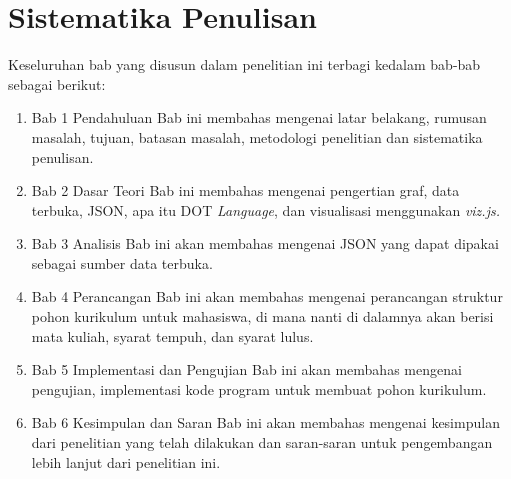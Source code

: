 \section{Sistematika Penulisan}
\label{sec:Sistematika Penulisan}
Keseluruhan bab yang disusun dalam penelitian ini terbagi kedalam bab-bab sebagai berikut:
\begin{enumerate}
\item Bab 1 Pendahuluan
Bab ini membahas mengenai latar belakang, rumusan masalah, tujuan, batasan masalah,
metodologi penelitian dan sistematika penulisan.
\item Bab 2 Dasar Teori
Bab ini membahas mengenai pengertian graf, data terbuka, JSON, apa itu DOT \textit{Language}, dan visualisasi menggunakan \textit{viz.js.}
\item Bab 3 Analisis 
Bab ini akan membahas mengenai JSON yang dapat dipakai sebagai sumber data terbuka.
\item Bab 4 Perancangan 
Bab ini akan membahas mengenai perancangan struktur pohon kurikulum untuk mahasiswa, di mana nanti di dalamnya akan berisi mata kuliah, syarat tempuh, dan syarat lulus. 
\item Bab 5 Implementasi dan Pengujian
Bab ini akan membahas mengenai pengujian, implementasi kode program untuk membuat pohon kurikulum.
\item Bab 6 Kesimpulan dan Saran
Bab ini akan membahas mengenai kesimpulan dari penelitian yang telah dilakukan dan
saran-saran untuk pengembangan lebih lanjut dari penelitian ini.
\end{enumerate}
